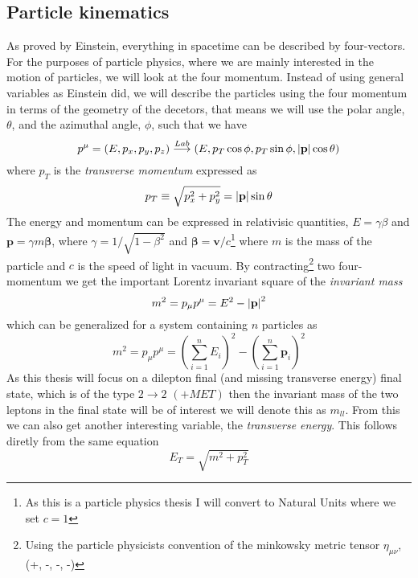 \documentclass[14pt, a4paper]{book}
\begin{document}
\subsection{Particle kinematics}\label{sec:particle_kinematics}
As proved by Einstein, everything in spacetime can be described by four-vectors. For the purposes of particle physics, where we are mainly interested in the motion of particles, 
we will look at the four momentum. Instead of using general variables as Einstein did, we will describe the particles using the four momentum in terms of the geometry of the decetors, that means we will use 
the polar angle, $\theta$, and the azimuthal angle, $\phi$, such that we have
\begin{equation}\label{eq:four-momentum}
    p^\mu = (E, p_x, p_y, p_z) \overset{Lab}{\longrightarrow} (E, p_T\cos\phi, p_T\sin\phi, \abs{\mathbf{p}}\cos\theta)
\end{equation}
where $p_T$ is the \textit{transverse momentum} expressed as
\begin{equation}\label{eq:transverse_momentum}
    p_T \equiv\sqrt{p_x^2 +p_y^2} = \abs{\mathbf{p}}\sin\theta
\end{equation}
The energy and momentum can be expressed in relativisic quantities, $E=\gamma\beta$ and $\mathbf{p}=\gamma m\bm\beta$, where $\gamma = 1/\sqrt{1-\beta^2}$ and $\bm\beta = \mathbf{v}/c$\footnote{As this is a particle physics thesis I will convert to Natural Units where we set $c=1$} 
where $m$ is the mass of the particle 
and $c$ is the speed of light in vacuum. By contracting\footnote{Using the particle physicists convention of the minkowsky metric tensor $\eta_{\mu\nu}$,  (+, -, -, -)} two four-momentum we get the important Lorentz invariant 
square of the \textit{invariant mass}
$$
    m^2 = p_\mu p^\mu = E^2 - \abs{\mathbf{p}}^2 
$$
which can be generalized for a system containing $n$ particles as
\begin{equation}\label{eq:invariant_mass}
    m^2 = p_\mu p^\mu = \left(\sum_{i=1}^n E_i\right)^2 - \left(\sum_{i=1}^n\mathbf{p}_i\right)^2
\end{equation}
As this thesis will focus on a dilepton final (and missing transverse energy) final state, which is of the type $2\rightarrow2$ $(+MET)$ then the invariant mass of the two leptons in the final state will be of interest 
we will denote this as $m_{ll}$. From this we can also get another interesting variable, the \textit{transverse energy}. This follows diretly from the same equation
\begin{equation}\label{eq:transverse_energy}
    E_T = \sqrt{m^2 + p_T^2}
\end{equation}
\end{document}
